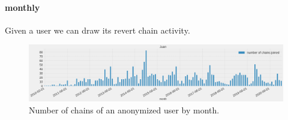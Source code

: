 


    

\clearpage
\paragraph*{monthly}
Given a user we can draw its revert chain activity. 
\begin{figure}[H]
    \centering
    \includegraphics[width=\textwidth]{./chapters/04/assets/chains_user_month.png}
    \caption{Number of chains of an anonymized user by month.}
    \label{fig:chainsusermonth}
\end{figure}





